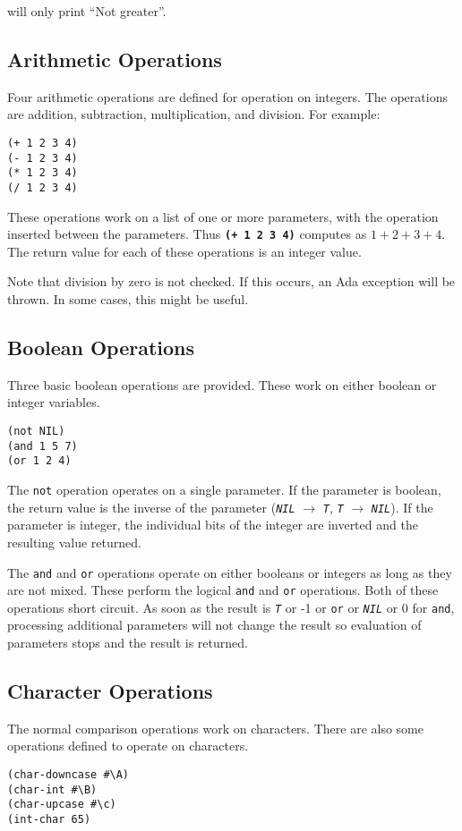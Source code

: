 \documentclass[10pt, openany]{book}
\newcommand{\operation}[1]{\textbf{\texttt{#1}}}
\newcommand{\function}[1]{\texttt{#1}}
\newcommand{\constant}[1]{\emph{\texttt{#1}}}
\begin{document}
will only print ``Not greater''.

\subsection{Arithmetic Operations}
Four arithmetic operations are defined for operation on integers.  The operations are addition, subtraction, multiplication, and division.  For example:
\begin{lstlisting}
(+ 1 2 3 4)
(- 1 2 3 4)
(* 1 2 3 4)
(/ 1 2 3 4)
\end{lstlisting}

These operations work on a list of one or more parameters, with the operation inserted between the parameters.  Thus \operation{(+ 1 2 3 4)} computes as $1+2+3+4$.  The return value for each of these operations is an integer value.

Note that division by zero is not checked.  If this occurs, an Ada exception will be thrown.  In some cases, this might be useful.

\subsection{Boolean Operations}
Three basic boolean operations are provided.  These work on either boolean or integer variables.
\begin{lstlisting}
(not NIL)
(and 1 5 7)
(or 1 2 4)
\end{lstlisting}

The \function{not} operation operates on a single parameter.  If the parameter is boolean, the return value is the inverse of the parameter (\constant{NIL} $\rightarrow$ \constant{T}, \constant{T} $\rightarrow$ \constant{NIL}).  If the parameter is integer, the individual bits of the integer are inverted and the resulting value returned.

The \function{and} and \function{or} operations operate on either booleans or integers as long as they are not mixed.  These perform the logical \function{and} and \function{or} operations.  Both of these operations short circuit.  As soon as the result is \constant{T} or -1 or \function{or} or \constant{NIL} or 0 for \function{and},  processing additional parameters will not change the result so evaluation of parameters stops and the result is returned.

\subsection{Character Operations}
The normal comparison operations work on characters.  There are also some operations defined to operate on characters.
\begin{lstlisting}
(char-downcase #\A)
(char-int #\B)
(char-upcase #\c)
(int-char 65)
\end{lstlisting}
\end{document}
